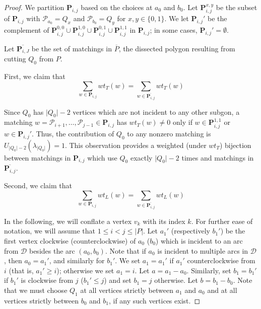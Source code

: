\documentclass[12pt]{article}
\theoremstyle{remark}
\newcommand*{\pathset}[2]{\mathbf{P}_{#1,#2}}
\newcommand*{\poly}[1]{\mathcal{P}_{#1}}
\newcommand*{\D}{\mathcal{D}}
\begin{document}
\begin{proof}
We partition $\pathset{i}{j}$ based on the choices at $a_0$ and $b_0$. Let $\pathset{i}{j}^{x,y}$ be the subset of $\pathset{i}{j}$ with $\poly{a_0} = Q_x$ and $\poly{b_0} = Q_y$ for $x,y \in \{0,1\}$. We let $\pathset{i}{j}'$ be the complement of $\pathset{i}{j}^{0,0} \cup \pathset{i}{j}^{1,0} \cup \pathset{i}{j}^{0,1} \cup \pathset{i}{j}^{1,1}$ in $\pathset{i}{j}$; in some cases, $\pathset{i}{j}' = \emptyset$. 

Let $\overline{\pathset{i}{J}}$ be the set of matchings in $\overline{P}$, the dissected polygon resulting from cutting $Q_0$ from $P$. 

First, we claim that \begin{equation}\label{eq:CutTradWeight} \sum_{w \in \pathset{i}{j}} wt_T(w) = \sum_{w \in \overline{\pathset{i}{j}}} wt_T(w)
\end{equation}

Since $Q_0$ has $\vert Q_0 \vert -2$ vertices which are not incident  to any other subgon, a matching $w = \poly{i+1}, \ldots, \poly{j-1} \in \pathset{i}{j}$ has $wt_T(w) \neq 0$ only if $w \in \pathset{i}{j}^{1,1}$ or $w \in \pathset{i}{j}'$. Thus, the contribution of $Q_0$ to any nonzero matching is $U_{\vert Q_0 \vert - 2}(\lambda_{\vert Q_0 \vert}) = 1$. This observation provides a weighted (under $wt_T$) bijection between matchings in $\pathset{i}{j}$ which use $Q_0$ exactly $\vert Q_0 \vert - 2$ times and matchings in $\overline{\pathset{i}{j}}$. 

Second, we claim that \begin{equation}\label{eq:CutLocalWeight} \sum_{w \in \pathset{i}{j}} wt_L(w) = \sum_{w \in \overline{\pathset{i}{j}}} wt_L(w)
\end{equation}

 In the following, we will conflate a vertex $v_k$ with its index $k$. For further ease of notation, we will assume that $1 \leq i < j \leq \vert P \vert$. Let $a_1'$ (respectively $b_1'$) be the  first vertex clockwise (counterclockwise) of $a_0$ ($b_0$) which is incident to an arc from $\D$ besides the arc $(a_0,b_0)$. Note that if $a_0$ is incident to multiple arcs in $\D$, then $a_0 = a_1'$, and similarly for $b_1'$. We set $a_1 = a_1'$ if $a_1'$ counterclockwise from $i$ (that is, $a_1' \geq i$); otherwise we set $a_1 = i$. Let $a = a_1 - a_0$. Similarly, set $b_1 = b_1'$ if $b_1'$ is clockwise from $j$ ($b_1' \leq j$) and set $b_1 = j$ otherwise. Let $b = b_1 - b_0$. Note that we must choose $Q_1$ at all vertices strictly between $a_1$ and $a_0$ and at all vertices strictly between $b_0$ and $b_1$, if any such vertices exist.


\end{proof}
\end{document}
